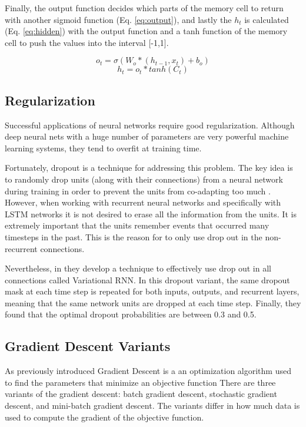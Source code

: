 Finally, the output function decides which parts of the memory cell to return with another sigmoid function (Eq. \ref{eq:output}), and lastly the $h_t$ is calculated (Eq. \ref{eq:hidden}) with the output function and a tanh function of the memory cell to push the values into the interval [-1,1].

\begin{equation} \label{eq:output}
o_t=\sigma(W_o*(h_{t-1},x_t)+b_o)
\end{equation}
\begin{equation} \label{eq:hidden}
h_t=o_t*tanh(C_t)
\end{equation}

\subsection{Regularization}

Successful applications of neural networks require good regularization. Although deep neural nets with a huge number of parameters are very powerful machine learning systems, they tend to overfit at training time. 

Fortunately, dropout is a technique for addressing this problem. The key idea is to randomly drop units (along with their connections) from a neural network during training in order to prevent the units from co-adapting too much \cite{srivastava2013improving}. However, when working with recurrent neural networks and specifically with LSTM networks it is not desired to erase all the information from the units. It is extremely important that the units remember events that occurred many timesteps in the past. This is the reason for \cite{zaremba2014recurrent} to only use drop out in the non-recurrent connections. 

Nevertheless, in \cite{gal2015theoretically} they develop a technique to effectively use drop out in all connections called Variational RNN. In this dropout variant, the same dropout mask at each time step is repeated for both inputs, outputs, and recurrent layers, meaning that the same network units are dropped at each time step. 
Finally, they found that the optimal dropout probabilities are between 0.3 and 0.5.

\subsection{Gradient Descent Variants}
As previously introduced Gradient Descent is a an optimization algorithm used to find the parameters that minimize an objective function
There are three variants of the gradient descent: batch gradient descent, stochastic gradient descent, and mini-batch gradient descent. The variants differ in how much data is used to compute the gradient of the objective function. 

